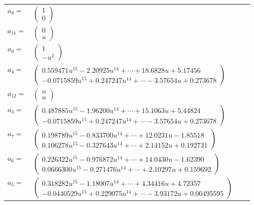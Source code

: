 \documentclass[1p]{elsarticle_modified}
\theoremstyle{definition}
\begin{document}
\begin{tabular}{m{7pt} m{180pt} m{7pt} m{180pt} }
\flushright $a_{8}=$&$\begin{pmatrix}1\\0\end{pmatrix}$ \\
\flushright $a_{11}=$&$\begin{pmatrix}0\\u\end{pmatrix}$ \\
\flushright $a_{9}=$&$\begin{pmatrix}1\\- u^2\end{pmatrix}$ \\
\flushright $a_{4}=$&$\begin{pmatrix}0.559471 u^{15}-2.20925 u^{14}+\cdots+18.6828 u+5.17456\\-0.0715859 u^{15}+0.247247 u^{14}+\cdots-3.57654 u+0.273678\end{pmatrix}$ \\
\flushright $a_{12}=$&$\begin{pmatrix}u\\u\end{pmatrix}$ \\
\flushright $a_{3}=$&$\begin{pmatrix}0.487885 u^{15}-1.96200 u^{14}+\cdots+15.1063 u+5.44824\\-0.0715859 u^{15}+0.247247 u^{14}+\cdots-3.57654 u+0.273678\end{pmatrix}$ \\
\flushright $a_{7}=$&$\begin{pmatrix}0.198789 u^{15}-0.833700 u^{14}+\cdots+12.0231 u-1.85518\\0.106278 u^{15}-0.327643 u^{14}+\cdots+2.14152 u+0.192731\end{pmatrix}$ \\
\flushright $a_{6}=$&$\begin{pmatrix}0.226322 u^{15}-0.976872 u^{14}+\cdots+14.0430 u-1.62390\\0.0666300 u^{15}-0.271476 u^{14}+\cdots+2.10297 u+0.159692\end{pmatrix}$ \\
\flushright $a_{5}=$&$\begin{pmatrix}0.318282 u^{15}-1.18007 u^{14}+\cdots+4.34416 u+4.72357\\-0.0440529 u^{15}+0.229075 u^{14}+\cdots-3.93172 u+0.00495595\end{pmatrix}$ \\

\end{tabular}
\end{document}
